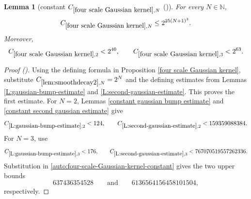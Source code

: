 \documentclass[12pt,reqno]{amsart}
\newcommand{\auto}{{({\tiny\faCar})}}
\theoremstyle{plain}
\newtheorem{lemma}[theorem]{Lemma}
\numberwithin{equation}{section}
\theoremstyle{remark}
\newcommand{\uses}[1]{}
\newcommand{\usesdefs}[1]{}
\newcommand{\N}{{\mathbb N}}
\begin{document}
\begin{lemma}[constant $C_{\ref{four scale Gaussian kernel},N}$ \auto]\label{constant four scale Gaussian kernel}\uses{lem:smoothdecay2,L:gaussian-bump-estimate,L:second-gaussian-estimate,constant gaussian bump estimate,constant second gaussian estimate,four scale Gaussian kernel}\usesdefs{}
For every $N\in\N$,
\begin{equation}\label{constant four scale Gaussian kernel bound}
C_{\ref{four scale Gaussian kernel},N}\le2^{25(N+1)^3}.
\end{equation}
Moreover,
\begin{equation}\label{auto:constant-four-scale-Gaussian-kernel-small}
C_{\ref{four scale Gaussian kernel},2}<2^{40},
\qquad
C_{\ref{four scale Gaussian kernel},3}<2^{63}.
\end{equation}
\end{lemma}
\begin{proof}[Proof \auto]
Using the defining formula in Proposition \ref{four scale Gaussian kernel}, substitute $C_{\ref{lem:smoothdecay2},N}=2^N$ and the defining estimates from Lemmas \ref{L:gaussian-bump-estimate} and \ref{L:second-gaussian-estimate}. This proves the first estimate. For $N=2$, Lemmas \ref{constant gaussian bump estimate} and \ref{constant second gaussian estimate} give
\[
C_{\ref{L:gaussian-bump-estimate},2}<124,
\qquad
C_{\ref{L:second-gaussian-estimate},2}<159359088384.
\]
For $N=3$, use
\[
C_{\ref{L:gaussian-bump-estimate},3}<176,
\qquad
C_{\ref{L:second-gaussian-estimate},3}<767070519557262336.
\]
Substitution in \eqref{auto:four-scale-Gaussian-kernel-constant} gives the two upper bounds
\[
637436354528
\qquad\text{and}\qquad
6136564156458101504,
\]
respectively.
\end{proof}
\end{document}
